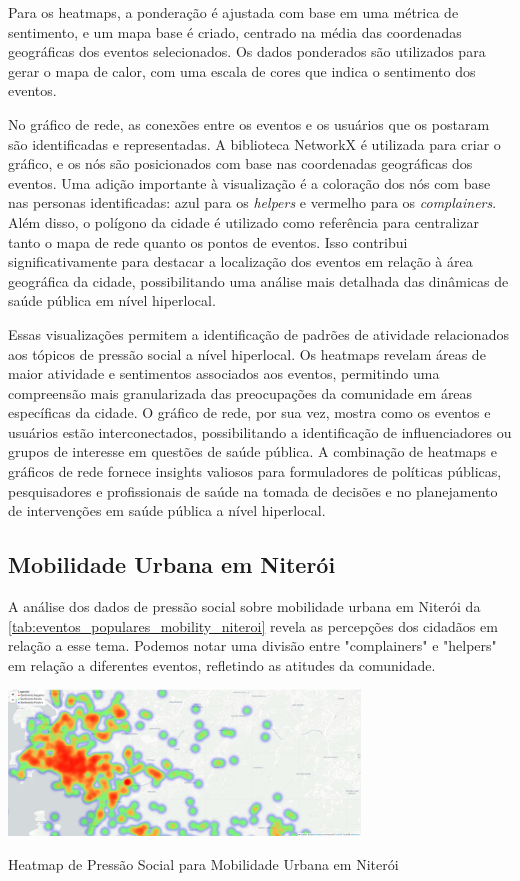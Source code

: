 Para os heatmaps, a ponderação é ajustada com base em uma métrica de sentimento, e um mapa base é criado, centrado na média das coordenadas geográficas dos eventos selecionados. Os dados ponderados são utilizados para gerar o mapa de calor, com uma escala de cores que indica o sentimento dos eventos.

No gráfico de rede, as conexões entre os eventos e os usuários que os postaram são identificadas e representadas. A biblioteca NetworkX é utilizada para criar o gráfico, e os nós são posicionados com base nas coordenadas geográficas dos eventos. Uma adição importante à visualização é a coloração dos nós com base nas personas identificadas: azul para os \textit{helpers}  e vermelho para os \textit{complainers}. Além disso, o polígono da cidade é utilizado como referência para centralizar tanto o mapa de rede quanto os pontos de eventos. Isso contribui significativamente para destacar a localização dos eventos em relação à área geográfica da cidade, possibilitando uma análise mais detalhada das dinâmicas de saúde pública em nível hiperlocal.

Essas visualizações permitem a identificação de padrões de atividade relacionados aos tópicos de pressão social a nível hiperlocal. Os heatmaps revelam áreas de maior atividade e sentimentos associados aos eventos, permitindo uma compreensão mais granularizada das preocupações da comunidade em áreas específicas da cidade. O gráfico de rede, por sua vez, mostra como os eventos e usuários estão interconectados, possibilitando a identificação de influenciadores ou grupos de interesse em questões de saúde pública. A combinação de heatmaps e gráficos de rede fornece insights valiosos para formuladores de políticas públicas, pesquisadores e profissionais de saúde na tomada de decisões e no planejamento de intervenções em saúde pública a nível hiperlocal.

\subsection{Mobilidade Urbana em Niterói}

A análise dos dados de pressão social sobre mobilidade urbana em Niterói da \autoref{tab:eventos_populares_mobility_niteroi} revela as percepções dos cidadãos em relação a esse tema. Podemos notar uma divisão entre "complainers" e "helpers" em relação a diferentes eventos, refletindo as atitudes da comunidade.

\begin{quadro}[htb]
	\centering
	\includegraphics[width=0.7\textwidth]{images/heatmap_niteroi.PNG}
	\caption{Heatmap de Pressão Social para Mobilidade Urbana em Niterói}
	\label{fig:heatmap_niteroi}
\end{quadro}

